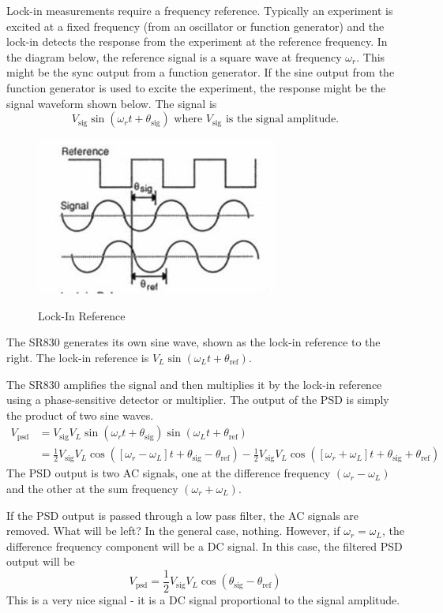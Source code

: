 \documentclass{../lab}
\begin{document}
Lock-in measurements require a frequency reference. Typically an experiment is excited at a fixed frequency (from an oscillator or function generator) and the lock-in detects the response from the experiment at the reference frequency. In the diagram below, the reference signal is a square wave at frequency $\omega_r$. This might be the sync output from a function generator. If the sine output from the function generator is used to excite the experiment, the response might be the signal waveform shown below. The signal is
\[
    V_\text{sig}\sin(\omega_rt + \theta_\text{sig}) \text{ where } V_\text{sig} \text{ is the signal amplitude.}
\]

\begin{figure}[h]
    \centering
    \href{http://experimentationlab.berkeley.edu/sites/default/files/images/300px-NMR33.jpg}{\includegraphics[width=0.5\linewidth]{images/300px-NMR33.jpg}}
    \caption{Lock-In Reference}
    \label{fig:300px-NMR33}
\end{figure}

The SR830 generates its own sine wave, shown as the lock-in reference to the right. The lock-in reference is $V_L \sin(\omega_Lt + \theta_\text{ref})$.

The SR830 amplifies the signal and then multiplies it by the lock-in reference using a phase-sensitive detector or multiplier. The output of the PSD is simply the product of two sine waves.
\begin{align*}
    V_\text{psd} &= V_\text{sig} V_L \sin (\omega_rt + \theta_\text{sig}) \sin (\omega_Lt + \theta_\text{ref}) \\
    &= \frac{1}{2} V_\text{sig} V_L \cos ([\omega_r - \omega_L ]t + \theta_\text{sig} - \theta_\text{ref}) - \frac{1}{2} V_\text{sig} V_L \cos ([\omega_r + \omega_L ]t + \theta_\text{sig} + \theta_\text{ref})
\end{align*}
The PSD output is two AC signals, one at the difference frequency $(\omega_r - \omega_L)$ and the other at the sum frequency $(\omega_r + \omega_L)$.

If the PSD output is passed through a low pass filter, the AC signals are removed. What will be left? In the general case, nothing. However, if $\omega_r = \omega_L$, the difference frequency component will be a DC signal. In this case, the filtered PSD output will be
\[
    V_\text{psd} = \frac{1}{2} V_\text{sig} V_L \cos(\theta_\text{sig} - \theta_\text{ref})
\]
This is a very nice signal - it is a DC signal proportional to the signal amplitude.
\end{document}
